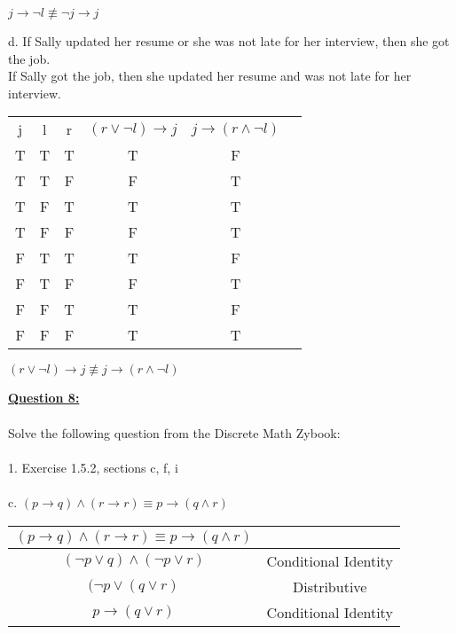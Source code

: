 \documentclass[11pt]{article}
\begin{document}
{\begin{center}
\begin{tabular}{ |c|c|c|c|c|}
 \hline
\end{tabular}

\end{center} 
\begin{center}
$ j \rightarrow  { \displaystyle \neg } l  \not\equiv  { \displaystyle \neg } j \rightarrow j $
\end{center}
\noindent d. 
If Sally updated her resume or she was not late for her interview, then she got the job.\\
If Sally got the job, then she updated her resume and was not late for her interview.\\
\begin{center}
 
\begin{tabular}{ |c|c|c|c|c|c| } 
 \hline
 j & l & r & $(r \vee { \displaystyle \neg } l) \rightarrow j $ & $j \rightarrow (r \wedge { \displaystyle \neg } l) $\\ 
 T & T & T & T & F \\ 
 T & T & F & F & T\\ 
 T & F & T & T & T \\ 
 T & F & F & F & T \\
 F & T & T & T & F \\ 
 F & T & F & F & T\\ 
 F & F & T & T & F \\ 
 F & F & F & T & T \\
 \hline
\end{tabular}

\end{center} 
\begin{center}
$(r \vee { \displaystyle \neg } l) \rightarrow j \not \equiv j \rightarrow (r \wedge { \displaystyle \neg } l) $
\end{center}

\pagebreak

\noindent \textbf{\ul{Question 8:}} \\
\\
Solve the following question from the Discrete Math Zybook:\\\\
1. Exercise 1.5.2, sections c, f, i \\\\
c. $(p \rightarrow q) \wedge (r \rightarrow r) \equiv p \rightarrow (q \wedge r) $\\
\begin{center}
\begin{tabular}{ |c|c| } 
 \hline
 $(p \rightarrow q) \wedge (r \rightarrow r) \equiv p \rightarrow (q \wedge r) $ & \space \\
 \hline
 $({ \displaystyle \neg} p \vee q) \wedge ({ \displaystyle \neg} p \vee r)$ & Conditional Identity\\
 \hline
 $({ \displaystyle \neg} p \vee (q \vee r)$ & Distributive \\
 \hline
 $p \rightarrow (q \vee r) $ & Conditional Identity\\
 

\end{tabular}
\end{center}}
\end{document}
